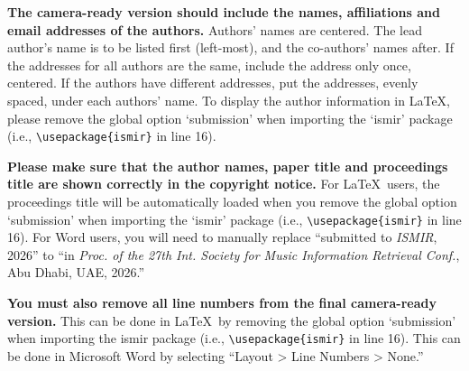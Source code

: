\documentclass{article}
\begin{document}
\textbf{The camera-ready version should include the names, affiliations and email addresses of the authors.} Authors' names are centered. The lead author's name is to be listed first (left-most), and the co-authors' names after. If the addresses for all authors are the same, include the address only once, centered. If the authors have different addresses, put the addresses, evenly spaced, under each authors' name. To display the author information in \LaTeX, please remove the global option `submission' when importing the `ismir' package (i.e., \texttt{\textbackslash usepackage\{ismir\}} in line 16).

\textbf{Please make sure that the author names, paper title and proceedings title are shown correctly in the copyright notice.} For \LaTeX\ users, the proceedings title will be automatically loaded when you remove the global option `submission' when importing the `ismir' package (i.e., \texttt{\textbackslash usepackage\{ismir\}} in line 16). For Word users, you will need to manually replace ``submitted to \textit{ISMIR}, 2026'' to ``in \textit{Proc. of the 27th Int. Society for Music Information Retrieval Conf.}, Abu Dhabi, UAE, 2026.''

\textbf{You must also remove all line numbers from the final camera-ready version.} This can be done in \LaTeX\ by removing the global option `submission' when importing the ismir package (i.e., \texttt{\textbackslash usepackage\{ismir\}} in line 16). This can be done in Microsoft Word by selecting ``Layout > Line Numbers > None.''



%
%
%
%
\end{document}
